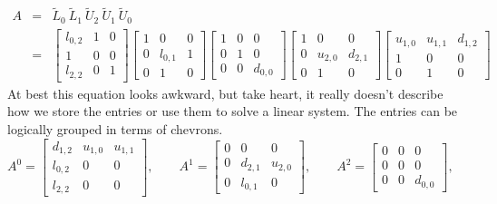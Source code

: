 \begin{eqnarray*}
A 
& = & 
{\tilde L}_0 \ 
{\tilde L}_1 \ 
{\tilde U}_2 \ 
{\tilde U}_1 \ 
{\tilde U}_0 \\
& = &
\left \lbrack \begin{array}{ccc}
l_{0,2} & 1 & 0 \\
1 & 0 & 0 \\
l_{2,2} & 0 & 1
\end{array} \right \rbrack
\left \lbrack \begin{array}{ccc}
1 & 0 & 0 \\
0 & l_{0,1} & 1 \\
0 & 1 & 0
\end{array} \right \rbrack
\left \lbrack \begin{array}{ccc}
1 & 0 & 0 \\
0 & 1 & 0 \\
0 & 0 & d_{0,0}
\end{array} \right \rbrack
\left \lbrack \begin{array}{ccc}
1 & 0 & 0 \\
0 & u_{2,0} & d_{2,1} \\
0 & 1 & 0
\end{array} \right \rbrack
\left \lbrack \begin{array}{ccc}
u_{1,0} & u_{1,1} & d_{1,2} \\
1 & 0 & 0 \\
0 & 1 & 0
\end{array} \right \rbrack
\end{eqnarray*}
At best this equation looks awkward, but take heart, it really
doesn't describe how we store the entries or use them to solve a
linear system.
The entries can be logically grouped in terms of chevrons.
$$
A^0 = 
\left \lbrack \begin{array}{ccc}
d_{1,2} & u_{1,0} & u_{1,1} \\
l_{0,2} & 0 & 0 \\
l_{2,2} & 0 & 0
\end{array} \right \rbrack,
\qquad
A^1 = 
\left \lbrack \begin{array}{ccc}
0 & 0 & 0 \\
0 & d_{2,1} & u_{2,0} \\
0 & l_{0,1} & 0
\end{array} \right \rbrack,
\qquad
A^2 = 
\left \lbrack \begin{array}{ccc}
0 & 0 & 0 \\
0 & 0 & 0 \\
0 & 0 & d_{0,0}
\end{array} \right \rbrack,
\qquad
$$
